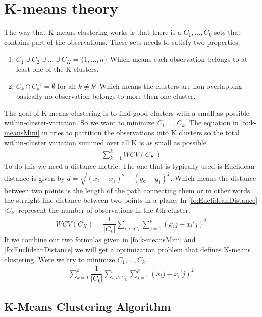 \section{K-means theory}
The way that K-means clustering works is that there is a $C_1,...,C_k$ sets that contains part of the observations. These sets needs to satisfy two properties.
\begin{enumerate}
	\item $ C_1 \cup C_2 \cup ... \cup C_K = \{ 1,...,n \}$ Which means each observation belongs to at least one of the K clusters.
	\item $ C_k \cap C_k' = \emptyset $ for all $k \neq k'$ Which means the clusters are non-overlapping basically no observation belongs to more then one cluster.
\end{enumerate}

The goal of K-means clustering is to find good clusters with a small as possible within-cluster-variation. So we want to minimize $ C_1,...,C_k $. The equation in \ref{fo:k-meansMini} in tries to partition the observations into K clusters so the total within-cluster variation summed over all K is as small as possible.
\begin{align}\label{fo:k-meansMini}
\sum_{k=1}^{k} WCV(C_K)
\end{align}
To do this we need a distance metric. The one that is typically used is Euclidean distance is given by $d = \sqrt{ (x_2 - x_1)^2 - (y_2 - y_1)^2 } $. Which means the distance between two points is the length of the path connecting them or in other words the straight-line distance between two points in a plane. In \ref{fo:EuclideanDistance} $ |C_k| $ represent the number of observations in the \textit{k}th cluster.
\begin{align}\label{fo:EuclideanDistance}
WCV(C_K) = \dfrac{1}{|C_k|}  \sum_{i,i' \varepsilon C_k}   \sum_{j=1}^{p}(x_ij - x_i'j)^2
\end{align}
If we combine our two formulas given in \ref{fo:k-meansMini} and \ref{fo:EuclideanDistance} we will get a optimization problem that defines K-means clustering. Were we try to minimize $ C_1,...,C_k $.
\begin{align}\label{fo:EuclideanDistance}
\sum_{k=1}^{k} \dfrac{1}{|C_k|}  \sum_{i,i' \varepsilon C_k}   \sum_{j=1}^{p}(x_ij - x_i'j)^2
\end{align}

\subsection{K-Means Clustering Algorithm}

